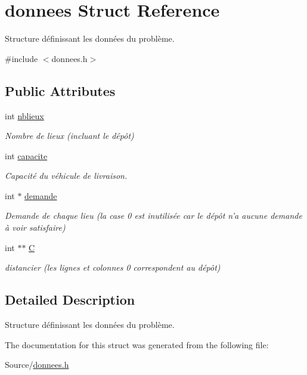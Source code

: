 \hypertarget{structdonnees}{\section{donnees \-Struct \-Reference}
\label{structdonnees}
}


\-Structure définissant les données du problème.  




{\ttfamily \#include $<$donnees.\-h$>$}

\subsection*{\-Public \-Attributes}
\begin{DoxyCompactItemize}
\item 
\hypertarget{structdonnees_aa9d976132f61d4d3d1ab846349919a59}{int \hyperlink{structdonnees_aa9d976132f61d4d3d1ab846349919a59}{nblieux}}\label{structdonnees_aa9d976132f61d4d3d1ab846349919a59}

\begin{DoxyCompactList}\small\item\em \-Nombre de lieux (incluant le dépôt) \end{DoxyCompactList}\item 
\hypertarget{structdonnees_a5c9d364da8a90f354617da181a37eb94}{int \hyperlink{structdonnees_a5c9d364da8a90f354617da181a37eb94}{capacite}}\label{structdonnees_a5c9d364da8a90f354617da181a37eb94}

\begin{DoxyCompactList}\small\item\em \-Capacité du véhicule de livraison. \end{DoxyCompactList}\item 
\hypertarget{structdonnees_a34cd14d3d17282fce557b634e1e8e2ff}{int $\ast$ \hyperlink{structdonnees_a34cd14d3d17282fce557b634e1e8e2ff}{demande}}\label{structdonnees_a34cd14d3d17282fce557b634e1e8e2ff}

\begin{DoxyCompactList}\small\item\em \-Demande de chaque lieu (la case 0 est inutilisée car le dépôt n'a aucune demande à voir satisfaire) \end{DoxyCompactList}\item 
\hypertarget{structdonnees_af03f1f723c3cadea1346e006a5747fc2}{int $\ast$$\ast$ \hyperlink{structdonnees_af03f1f723c3cadea1346e006a5747fc2}{\-C}}\label{structdonnees_af03f1f723c3cadea1346e006a5747fc2}

\begin{DoxyCompactList}\small\item\em distancier (les lignes et colonnes 0 correspondent au dépôt) \end{DoxyCompactList}\end{DoxyCompactItemize}


\subsection{\-Detailed \-Description}
\-Structure définissant les données du problème. 

\-The documentation for this struct was generated from the following file\-:\begin{DoxyCompactItemize}
\item 
\-Source/\hyperlink{donnees_8h}{donnees.\-h}\end{DoxyCompactItemize}
